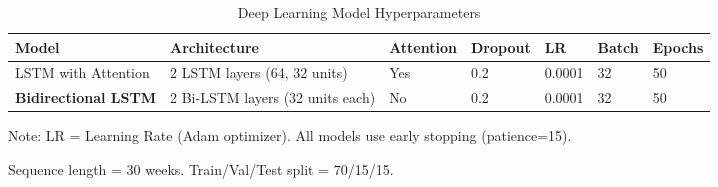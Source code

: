 \begin{table}[htbp]
\centering
\caption{Deep Learning Model Hyperparameters}
\label{tab:hyperparameters}
\begin{tabular}{lllllll}
\toprule
\textbf{Model} & \textbf{Architecture} & \textbf{Attention} & \textbf{Dropout} & \textbf{LR} & \textbf{Batch} & \textbf{Epochs} \\
\midrule
LSTM with Attention & 2 LSTM layers (64, 32 units) & Yes & 0.2 & 0.0001 & 32 & 50 \\
\textbf{Bidirectional LSTM} & 2 Bi-LSTM layers (32 units each) & No & 0.2 & 0.0001 & 32 & 50 \\
\bottomrule
\end{tabular}
\begin{tablenotes}
\small
\item Note: LR = Learning Rate (Adam optimizer). All models use early stopping (patience=15).
\item Sequence length = 30 weeks. Train/Val/Test split = 70/15/15.
\end{tablenotes}
\end{table}
